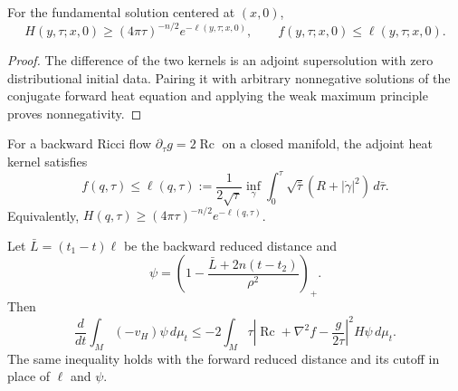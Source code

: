 \begin{lemma}
\label{lem:chow-ii-ch16-adjoint-dominates-reduced}
For the fundamental solution centered at $(x,0)$,
\[
H(y,\tau;x,0)\ge(4\pi\tau)^{-n/2}e^{-\ell(y,\tau;x,0)},
\qquad f(y,\tau;x,0)\le\ell(y,\tau;x,0).
\]
\end{lemma}
\begin{proof}
The difference of the two kernels is an adjoint supersolution with zero
distributional initial data. Pairing it with arbitrary nonnegative solutions
of the conjugate forward heat equation and applying the weak maximum principle
proves nonnegativity.
\end{proof}

\begin{theorem}
\label{thm:chow-ii-ch16-reduced-distance-harnack}
For a backward Ricci flow $\partial_\tau g=2\operatorname{Rc}$ on a closed
manifold, the adjoint heat kernel satisfies
\[
f(q,\tau)\le\ell(q,\tau):=\frac1{2\sqrt\tau}
 \inf_\gamma\int_0^\tau\sqrt{\bar\tau}
 \left(R+|\dot\gamma|^2\right)\,d\bar\tau.
\]
Equivalently, $H(q,\tau)\ge(4\pi\tau)^{-n/2}e^{-\ell(q,\tau)}$.
\end{theorem}

\begin{theorem}
\label{thm:chow-ii-ch16-localized-perelman-entropy}
Let $\bar L=(t_1-t)\ell$ be the backward reduced distance and
\[
\psi=\left(1-\frac{\bar L+2n(t-t_2)}{\rho^2}\right)_+.
\]
Then
\[
\frac{d}{dt}\int_M(-v_H)\psi\,d\mu_t
\le-2\int_M\tau\left|\operatorname{Rc}+\nabla^2f-\frac{g}{2\tau}\right|^2H\psi\,d\mu_t.
\]
The same inequality holds with the forward reduced distance and its cutoff in
place of $\ell$ and $\psi$.
\end{theorem}
